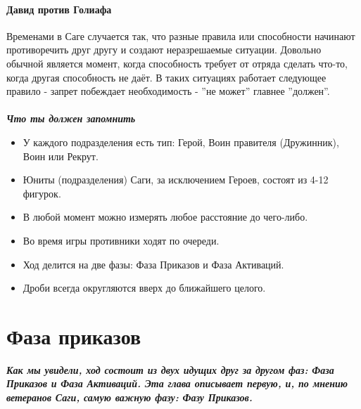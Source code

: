\documentclass[a4paper,11pt,twoside]{article}
\begin{document}
\subsection*{Давид против Голиафа}

Временами в Саге случается так, что разные правила или способности начинают противоречить друг другу и создают неразрешаемые ситуации. Довольно обычной является момент, когда способность требует от отряда сделать что-то, когда другая способность не даёт. В таких ситуациях работает следующее правило - запрет побеждает необходимость - ''не может'' главнее ''должен''. \\ \\ 


\begingroup
\fontsize{15pt}{11pt}\selectfont
\textit{\textbf{Что ты должен запомнить}}\\ 
\fontsize{11pt}{11pt}\selectfont
\begin{itemize}
\item У каждого подразделения есть тип: Герой, Воин правителя (Дружинник), Воин или Рекрут.
\item Юниты (подразделения) Саги, за исключением Героев, состоят из 4-12 фигурок.
\item В любой момент можно измерять любое расстояние до чего-либо.
\item Во время игры противники ходят по очереди.
\item Ход делится на две фазы: Фаза Приказов и Фаза Активаций.
\item Дроби всегда округляются вверх до ближайшего целого.
\end{itemize}
\endgroup 
\newpage
\part{Фаза приказов}
\textbf{\textit{Как мы увидели, ход состоит из двух идущих друг за другом фаз: Фаза Приказов и Фаза Активаций. Эта глава описывает первую, и, по мнению ветеранов Саги, самую важную фазу: Фазу Приказов. }} 
\end{document}
